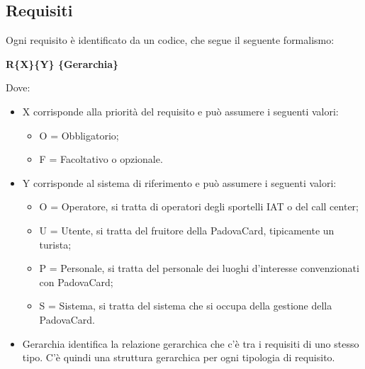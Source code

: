 \subsection{Requisiti}
Ogni requisito è identificato da un codice, che segue il seguente formalismo:

\begin{center}
\textbf{R\{X\}\{Y\} \{Gerarchia\}}
\end{center}

Dove:
\begin{itemize}
\item X corrisponde alla priorità del requisito e può assumere i seguenti valori:
	\begin{itemize}
		\item O = Obbligatorio;
        \item F = Facoltativo o opzionale.
	\end{itemize}
\item Y corrisponde al sistema di riferimento e può assumere i seguenti valori:
	\begin{itemize}
		\item O = Operatore, si tratta di operatori degli sportelli IAT o del call center;
        \item U = Utente, si tratta del fruitore della PadovaCard, tipicamente un turista;
        \item P = Personale, si tratta del personale dei luoghi d'interesse convenzionati con PadovaCard;
        \item S = Sistema, si tratta del sistema che si occupa della gestione della PadovaCard.
	\end{itemize}
\item Gerarchia identifica la relazione gerarchica che c'è tra i requisiti di uno stesso tipo. C'è quindi una struttura gerarchica per ogni tipologia di requisito.
\end{itemize}

\newpage

